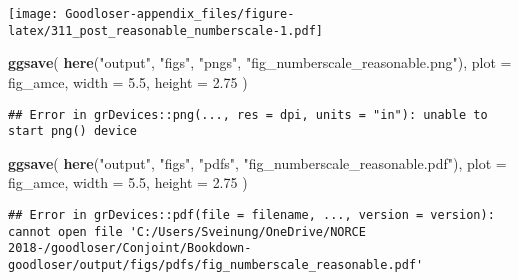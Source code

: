 \documentclass[]{book}
\newenvironment{Shaded}{\begin{snugshade}}{\end{snugshade}}
\newcommand{\KeywordTok}[1]{\textcolor[rgb]{0.13,0.29,0.53}{\textbf{#1}}}
\newcommand{\DataTypeTok}[1]{\textcolor[rgb]{0.13,0.29,0.53}{#1}}
\newcommand{\FloatTok}[1]{\textcolor[rgb]{0.00,0.00,0.81}{#1}}
\newcommand{\StringTok}[1]{\textcolor[rgb]{0.31,0.60,0.02}{#1}}
\newcommand{\NormalTok}[1]{#1}
\begin{document}
\texttt{[image: Goodloser-appendix\_files/figure-latex/311\_post\_reasonable\_numberscale-1.pdf]}

\begin{Shaded}
\begin{Highlighting}[]
\KeywordTok{ggsave}\NormalTok{(}
  \KeywordTok{here}\NormalTok{(}\StringTok{"output"}\NormalTok{, }\StringTok{"figs"}\NormalTok{, }\StringTok{"pngs"}\NormalTok{, }\StringTok{"fig_numberscale_reasonable.png"}\NormalTok{),}
  \DataTypeTok{plot =}\NormalTok{ fig_amce,}
  \DataTypeTok{width =} \FloatTok{5.5}\NormalTok{, }\DataTypeTok{height =} \FloatTok{2.75}
\NormalTok{)}
\end{Highlighting}
\end{Shaded}

\begin{verbatim}
## Error in grDevices::png(..., res = dpi, units = "in"): unable to start png() device
\end{verbatim}

\begin{Shaded}
\begin{Highlighting}[]
\KeywordTok{ggsave}\NormalTok{(}
  \KeywordTok{here}\NormalTok{(}\StringTok{"output"}\NormalTok{, }\StringTok{"figs"}\NormalTok{, }\StringTok{"pdfs"}\NormalTok{, }\StringTok{"fig_numberscale_reasonable.pdf"}\NormalTok{),}
  \DataTypeTok{plot =}\NormalTok{ fig_amce,}
  \DataTypeTok{width =} \FloatTok{5.5}\NormalTok{, }\DataTypeTok{height =} \FloatTok{2.75}
\NormalTok{)}
\end{Highlighting}
\end{Shaded}

\begin{verbatim}
## Error in grDevices::pdf(file = filename, ..., version = version): cannot open file 'C:/Users/Sveinung/OneDrive/NORCE 2018-/goodloser/Conjoint/Bookdown-goodloser/output/figs/pdfs/fig_numberscale_reasonable.pdf'
\end{verbatim}
\end{document}
